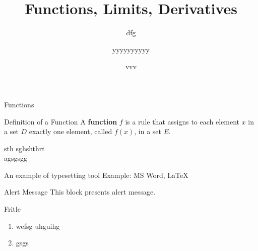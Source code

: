 \documentclass{beamer}
\title[subtitle]{Functions, Limits, Derivatives}
\subtitle{dfg}
\author[]{yyyyyyyyyy}
\institute{yyyyy}
\date{vvv}
\begin{document}
\begin{frame}
\titlepage
\end{frame}

\begin{frame}[t]{Functions} \vspace{4pt} %
\begin{block}{Definition of a Function}
\vspace{0.5em}
A \textbf{function} $f$ is a rule that assigns to each element $x$ in a set $D$ exactly one element, called $f(x)$, in a set $E$.
\vspace{0.5em}
\end{block}
\end{frame}

\begin{frame}{sth}
sghshthrt \\ 
agsgsgg  \\ 
 \begin{exampleblock}{An example of typesetting tool}
        Example: MS Word, \LaTeX{}
    \end{exampleblock}
     \begin{alertblock}{Alert Message}
        This block presents alert message.
    \end{alertblock}
    
\end{frame}

\begin{frame}[t]{Fritle}
    \begin{enumerate}
        \item wefsg  uhguihg \\
        \item gsgs \\
    \end{enumerate}
\end{frame}
\end{document}
